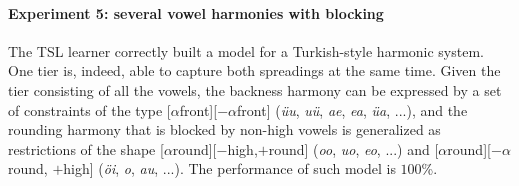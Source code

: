 \begin{table}[h!]
\centering
{}
\caption{TSL learning of several vowel harmonies without blockers; abstract representation.}
\end{table}


\paragraph{Experiment 5: several vowel harmonies with blocking}

The TSL learner correctly built a model for a Turkish-style harmonic system.
One tier is, indeed, able to capture both spreadings at the same time.
Given the tier consisting of all the vowels, the backness harmony can be expressed by a set of constraints of the type {[}$\alpha$front{]}{[}$-\alpha$front{]} (\emph{\"uu}, \emph{u\"u}, \emph{ae}, \emph{ea}, \emph{\"ua}, ...), and the rounding harmony that is blocked by non-high vowels is generalized as restrictions of the shape {[}$\alpha$round{]}{[}$-$high,$+$round{]} (\emph{oo}, \emph{uo}, \emph{eo}, ...) and {[}$\alpha$round{]}{[}$-\alpha$round, $+$high{]} (\emph{\"oi}, \emph{o\textsci}, \emph{au}, ...).
The performance of such model is $100$\%.

